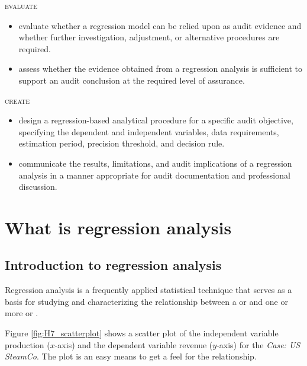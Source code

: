 \noindent \textsc{evaluate}
\begin{itemize}

\item evaluate whether a regression model can be relied upon as audit evidence and whether further investigation, adjustment, or alternative procedures are required.
\item assess whether the evidence obtained from a regression analysis is sufficient to support an audit conclusion at the required level of assurance.
\end{itemize}

\noindent \textsc{create}
\begin{itemize}

\item design a regression-based analytical procedure for a specific audit objective, specifying the dependent and independent variables, data requirements, estimation period, precision threshold, and decision rule.
\item communicate the results, limitations, and audit implications of a regression analysis in a manner appropriate for audit documentation and professional discussion.
\end{itemize}

\section{What is regression analysis}
\label{sec:what_is_regression_analysis}
\subsection{Introduction to regression analysis} %
\label{sub:quick_overview}

Regression analysis is a frequently applied statistical technique that serves as a basis for studying and characterizing the relationship between a  or  and one or more  or . 

Figure \ref{fig:H7_scatterplot} shows a scatter plot of the independent variable production ($x$-axis) and the dependent variable revenue ($y$-axis) for the \textit{Case: US SteamCo}. 
The plot is an easy means to get a feel for the relationship. 

